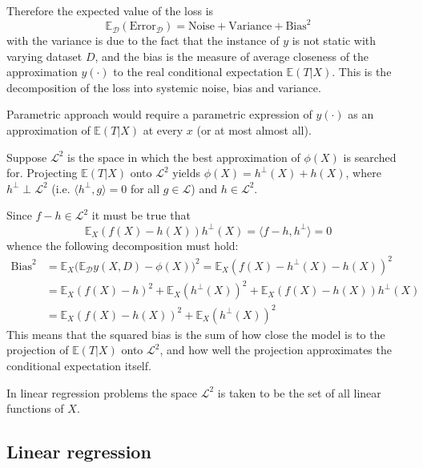\documentclass[a4paper]{article}
\newcommand{\Dcal}{\mathcal{D}}
\newcommand{\Lcal}{\mathcal{L}}
\newcommand{\Ex}[0]{{\mathbb{E}}}
\begin{document}
Therefore the expected value of the loss is 
\[\Ex_\Dcal(\text{Error}_\Dcal) = \text{Noise} + \text{Variance} + \text{Bias}^2\]
with the variance is due to the fact that the instance of $y$ is not static with
varying dataset $D$, and the bias is the measure of average closeness of the
approximation $y(\cdot)$ to the real conditional expectation $\Ex(T\rvert X)$.
This is the decomposition of the loss into systemic noise, bias and variance.


Parametric approach would require a parametric expression of $y(\cdot)$ as an
approximation of $\Ex(T\rvert X)$ at every $x$ (or at most almost all).

Suppose $\Lcal^2$ is the space in which the best approximation of $\phi(X)$ is
searched for. Projecting $\Ex(T\rvert X)$ onto $\Lcal^2$ yields $\phi(X) = h^\perp(X) + h(X)$,
where $h^\perp \perp \Lcal^2$ (i.e. $\langle h^\perp,g\rangle = 0$ for all
$g\in \Lcal$) and $h\in \Lcal^2$.



Since $f-h\in\Lcal^2$ it must be true that
\[\Ex_X (f(X) - h(X)) h^\perp(X) = \langle f-h, h^\perp\rangle = 0 \]
whence the following decomposition must hold:
\begin{align*}
	\text{Bias}^2 &= \Ex_X \bigl( \Ex_\Dcal y(X,D) - \phi(X) \bigr)^2 
		= \Ex_X (f(X) - h^\perp(X) - h(X))^2 \\
		& = \Ex_X (f(X) - h)^2 + \Ex_X (h^\perp(X))^2 + \Ex_X (f(X) - h(X)) h^\perp(X) \\
		& = \Ex_X (f(X) - h(X))^2 + \Ex_X (h^\perp(X))^2
\end{align*}
This means that the squared bias is the sum of how close the model is to the projection
of $\Ex(T\rvert X)$ onto $\Lcal^2$, and how well the projection approximates the
conditional expectation itself.

In linear regression problems the space $\Lcal^2$ is taken to be the set of all
linear functions of $X$.

\subsection*{Linear regression} %
\label{sub:linear_regression}
\end{document}
